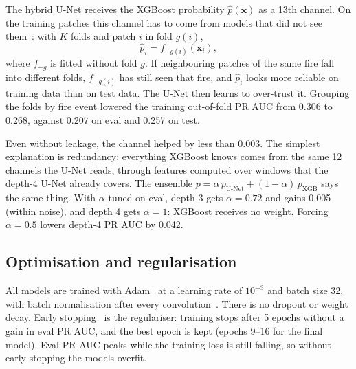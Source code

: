 The hybrid U-Net receives the XGBoost probability $\hat p(\mathbf{x})$ as a 13th channel. On the
training patches this channel has to come from models that did not see them~\cite{wolpert1992}: with
$K$ folds and patch $i$ in fold $g(i)$,
\begin{equation}
\hat p_i = f_{-g(i)}(\mathbf{x}_i),
\label{eq:oof}
\end{equation}
where $f_{-g}$ is fitted without fold $g$. If neighbouring patches of the same fire fall into different
folds, $f_{-g(i)}$ has still seen that fire, and $\hat p_i$ looks more reliable on training data than on
test data. The U-Net then learns to over-trust it. Grouping the folds by fire event lowered the training
out-of-fold PR AUC from 0.306 to 0.268, against 0.207 on eval and 0.257 on test.

Even without leakage, the channel helped by less than 0.003. The simplest explanation is redundancy:
everything XGBoost knows comes from the same 12 channels the U-Net reads, through features computed over
windows that the depth-4 U-Net already covers. The ensemble
$p = \alpha\, p_{\text{U-Net}} + (1-\alpha)\, p_{\text{XGB}}$ says the same thing. With $\alpha$ tuned
on eval, depth 3 gets $\alpha = 0.72$ and gains 0.005 (within noise), and depth 4 gets $\alpha = 1$:
XGBoost receives no weight. Forcing $\alpha = 0.5$ lowers depth-4 PR AUC by 0.042.

\subsection{Optimisation and regularisation}

All models are trained with Adam~\cite{kingma2015} at a learning rate of $10^{-3}$ and batch size 32, with
batch normalisation after every convolution~\cite{ioffe2015}. There is no dropout or weight decay. Early
stopping~\cite{prechelt1998} is the regulariser: training stops after 5 epochs without a gain in eval PR
AUC, and the best epoch is kept (epochs 9--16 for the final model). Eval PR AUC peaks while the training
loss is still falling, so without early stopping the models overfit.
